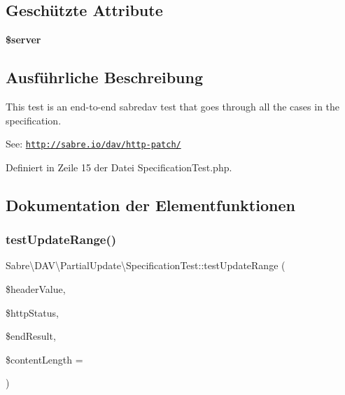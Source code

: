 \subsection*{Geschützte Attribute}
\begin{DoxyCompactItemize}
\item 
\mbox{\label{class_sabre_1_1_d_a_v_1_1_partial_update_1_1_specification_test_a7b2452b4e6b1e0ac211a38ff64848036}} 
{\bfseries \$server}
\end{DoxyCompactItemize}


\subsection{Ausführliche Beschreibung}
This test is an end-\/to-\/end sabredav test that goes through all the cases in the specification.

See\+: \href{http://sabre.io/dav/http-patch/}{\tt http\+://sabre.\+io/dav/http-\/patch/} 

Definiert in Zeile 15 der Datei Specification\+Test.\+php.



\subsection{Dokumentation der Elementfunktionen}
\mbox{\label{class_sabre_1_1_d_a_v_1_1_partial_update_1_1_specification_test_a9390c4197dd217ff2e9883b4228008af}} 
\subsubsection{\texorpdfstring{test\+Update\+Range()}{testUpdateRange()}}
{\footnotesize\ttfamily Sabre\textbackslash{}\+D\+A\+V\textbackslash{}\+Partial\+Update\textbackslash{}\+Specification\+Test\+::test\+Update\+Range (\begin{DoxyParamCaption}\item[{}]{\$header\+Value,  }\item[{}]{\$http\+Status,  }\item[{}]{\$end\+Result,  }\item[{}]{\$content\+Length = {} }\end{DoxyParamCaption})}


